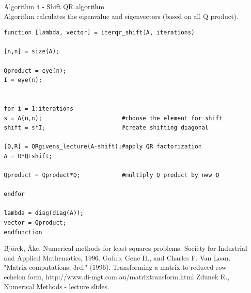 \documentclass[eng,openany]{mgr}
\begin{document}
\newpage
Algorithm 4 - Shift QR algorithm\\
Algorithm calculates the eigenvalue and eigenvectors (based on all Q product).
\begin{lstlisting}
function [lambda, vector] = iterqr_shift(A, iterations)

[n,n] = size(A);

Qproduct = eye(n);
I = eye(n);


for i = 1:iterations
s = A(n,n);                       #choose the element for shift
shift = s*I;                      #create shifting diagonal

[Q,R] = QRgivens_lecture(A-shift);#apply QR factorization
A = R*Q+shift;

Qproduct = Qproduct*Q;            #multiply Q product by new Q

endfor

lambda = diag(diag(A));
vector = Qproduct;
endfunction
\end{lstlisting}
\begin{thebibliography}{8}
Björck, Åke. Numerical methods for least squares problems. Society for Industrial and Applied Mathematics, 1996.
Golub, Gene H., and Charles F. Van Loan. "Matrix computations, 3rd." (1996).
Transforming a matrix to reduced row echelon form, http://www.di-mgt.com.au/matrixtransform.html
Zdunek R., Numerical Methods - lecture slides.
\end{thebibliography}
\end{document}
